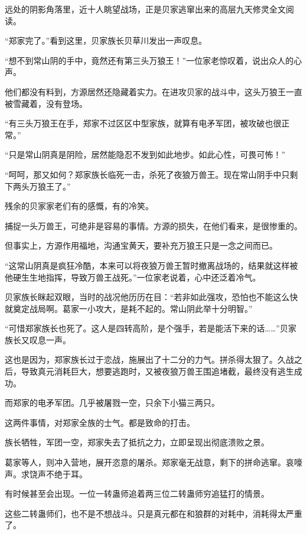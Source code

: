 
\begin{this_body}

远处的阴影角落里，近十人眺望战场，正是贝家逃窜出来的高层九天修灵全文阅读。

“郑家完了。”看到这里，贝家族长贝草川发出一声叹息。

“想不到常山阴的手中，竟然还有第三头万狼王！”一位家老惊叹着，说出众人的心声。

他们都没有料到，方源居然还隐藏着实力。在进攻贝家的战斗中，这头万狼王一直被雪藏着，没有登场。

“有三头万狼王在手，郑家不过区区中型家族，就算有电矛军团，被攻破也很正常。”

“只是常山阴真是阴险，居然能隐忍不发到如此地步。如此心性，可畏可怖！”

“呵呵，那又如何？郑家族长临死一击，杀死了夜狼万兽王。现在常山阴手中只剩下两头万狼王了。”

残余的贝家家老们有的感慨，有的冷笑。

捕捉一头万兽王，可绝非是容易的事情。方源的损失，在他们看来，是很惨重的。

但事实上，方源作用福地，沟通宝黄天，要补充万狼王只是一念之间而已。

“这常山阴真是疯狂冷酷，本来可以将夜狼万兽王暂时撤离战场的，结果就这样被他硬生生地指挥，导致万兽王战死。”一位家老说着，心中还泛着冷气。

贝家族长眯起双眼，当时的战况他历历在目：“若非如此强攻，恐怕也不能这么快就奠定战局啊。葛家一小攻大，是耗不起的。常山阴此举十分明智。”

“可惜郑家族长也死了。这人是四转高阶，是个强手，若是能活下来的话……”贝家族长又叹息一声。

这也是因为，郑家族长过于恋战，施展出了十二分的力气。拼杀得太狠了。久战之后，导致真元消耗巨大，想要逃跑时，又被夜狼万兽王围追堵截，最终没有逃生成功。

而郑家的电矛军团。几乎被屠戮一空，只余下小猫三两只。

这两件事情，对郑家全族的士气。都是致命的打击。

族长牺牲，军团一空，郑家失去了抵抗之力，立即呈现出彻底溃败之景。

葛家等人，则冲入营地，展开恣意的屠杀。郑家毫无战意，剩下的拼命逃窜。哀嚎声。求饶声不绝于耳。

有时候甚至会出现。一位一转蛊师追着两三位二转蛊师穷追猛打的情景。

这些二转蛊师们，也不是不想战斗。只是真元都在和狼群的对耗中，消耗得太严重了。


\end{this_body}

